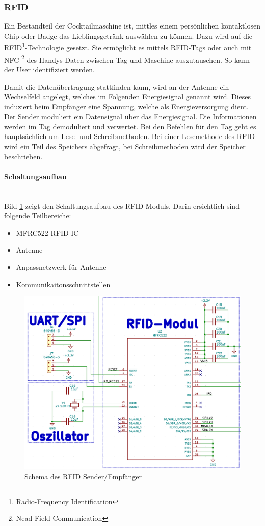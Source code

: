 \subsubsection{RFID}
\label{subsubsec:RFID}


Ein Bestandteil der Cocktailmaschine ist, mittles einem persönlichen kontaktlosen Chip oder Badge das Lieblingsgetränk auswählen zu können. Dazu wird auf die RFID\footnote{Radio-Frequency Identification}-Technologie gesetzt. Sie ermöglicht es mittels RFID-Tags oder auch mit NFC \footnote{Nead-Field-Communication} des Handys Daten zwischen Tag und Maschine auszutauschen. So kann der User identifiziert werden.

Damit die Datenübertragung stattfinden kann, wird an der Antenne ein Wechselfeld angelegt, welches im Folgenden Energiesignal genannt wird. Dieses induziert beim Empfänger eine Spannung, welche als Energieversorgung dient. Der Sender moduliert ein Datensignal über das Energiesignal. Die Informationen werden im Tag demoduliert und verwertet. Bei den Befehlen für den Tag geht es hauptsächlich um Lese- und Schreibmethoden. Bei einer Lesemethode des RFID wird ein Teil des Speichers abgefragt, bei Schreibmethoden wird der Speicher beschrieben.

\paragraph{Schaltungsaufbau}\mbox{}\\

Bild \ref{fig:Schema_RFID} zeigt den Schaltungsaufbau des RFID-Moduls. Darin ersichtlich sind folgende Teilbereiche:

\begin{itemize}
\item MFRC522 RFID IC
\item Antenne
\item Anpassnetzwerk für Antenne
\item Kommunikaitonsschnittstellen
\end{itemize}

\begin{figure}[!h]
\center
\includegraphics[width = 0.5 \textwidth]{graphics/Schema_RFID}
\caption{Schema des RFID Sender/Empfänger}
\label{fig:Schema_RFID}
\end{figure}


